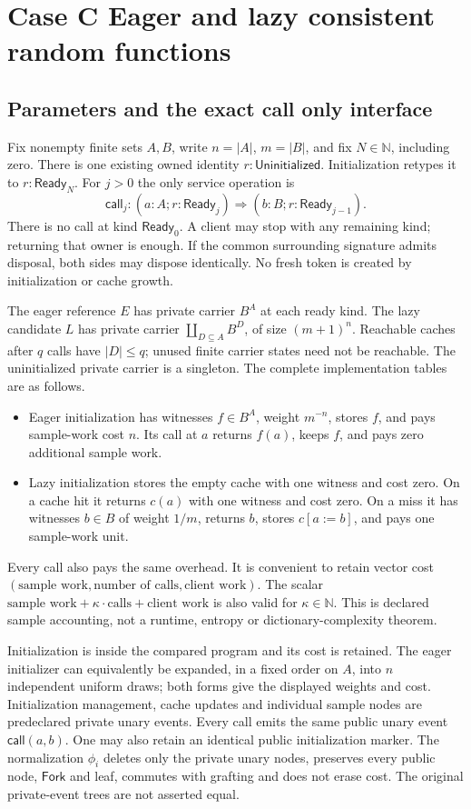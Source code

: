 \section{Case C Eager and lazy consistent random functions}\label{sec:caseC}

\subsection{Parameters and the exact call only interface}
Fix nonempty finite sets $A,B$, write $n=|A|$, $m=|B|$, and fix
$N\in\mathbb N$, including zero. There is one existing owned identity
$r:\mathsf{Uninitialized}$. Initialization retypes it to
$r:\mathsf{Ready}_N$. For $j>0$ the only service operation is
\[
\mathsf{call}_j:(a:A;r:\mathsf{Ready}_j)
\Rightarrow(b:B;r:\mathsf{Ready}_{j-1}).
\]
There is no call at kind $\mathsf{Ready}_0$. A client may stop with any
remaining kind; returning that owner is enough. If the common surrounding
signature admits disposal, both sides may dispose identically. No fresh
token is created by initialization or cache growth.

The eager reference $E$ has private carrier $B^A$ at each ready kind.
The lazy candidate $L$ has private carrier
$\coprod_{D\subseteq A}B^D$, of size $(m+1)^n$. Reachable caches after
$q$ calls have $|D|\leq q$; unused finite carrier states need not be
reachable. The uninitialized private carrier is a singleton. The complete
implementation tables are as follows.
\begin{itemize}
\item Eager initialization has witnesses $f\in B^A$, weight $m^{-n}$,
  stores $f$, and pays sample-work cost $n$. Its call at $a$ returns
  $f(a)$, keeps $f$, and pays zero additional sample work.
\item Lazy initialization stores the empty cache with one witness and
  cost zero. On a cache hit it returns $c(a)$ with one witness and cost
  zero. On a miss it has witnesses $b\in B$ of weight $1/m$, returns
  $b$, stores $c[a:=b]$, and pays one sample-work unit.
\end{itemize}
Every call also pays the same overhead. It is convenient to retain vector
cost $(\text{sample work},\text{number of calls},\text{client work})$.
The scalar $\text{sample work}+\kappa\cdot\text{calls}+\text{client
work}$ is also valid for $\kappa\in\mathbb N$. This is declared sample
accounting, not a runtime, entropy or dictionary-complexity theorem.

Initialization is inside the compared program and its cost is retained.
The eager initializer can equivalently be expanded, in a fixed order on
$A$, into $n$ independent uniform draws; both forms give the displayed
weights and cost. Initialization management, cache updates and individual
sample nodes are predeclared private unary events. Every call emits the
same public unary event $\mathsf{call}(a,b)$. One may also retain an
identical public initialization marker. The normalization $\phi_i$
deletes only the private unary nodes, preserves every public node,
$\mathsf{Fork}$ and leaf, commutes with grafting and does not erase cost.
The original private-event trees are not asserted equal.

